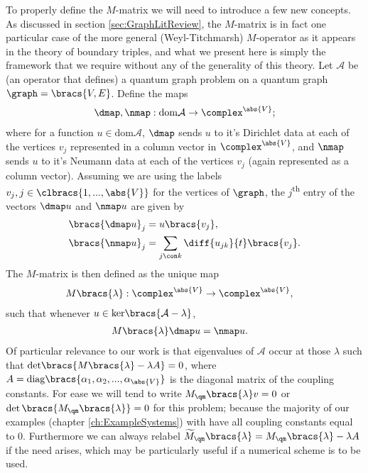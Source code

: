 To properly define the $M$-matrix we will need to introduce a few new concepts.
As discussed in section \ref{sec:GraphLitReview}, the $M$-matrix is in fact one particular case of the more general (Weyl-Titchmarsh) $M$-operator as it appears in the theory of boundary triples, and what we present here is simply the framework that we require without any of the generality of this theory.
Let $\mathcal{A}$ be (an operator that defines) a quantum graph problem on a quantum graph $\graph=\bracs{V,E}$.
Define the maps
\begin{align*}
	\dmap, \nmap: \mathrm{dom}\mathcal{A} \rightarrow \complex^{\abs{V}};
\end{align*}
where for a function $u\in\mathrm{dom}\mathcal{A}$, $\dmap$ sends $u$ to it's Dirichlet data at each of the vertices $v_j$ represented in a column vector in $\complex^{\abs{V}}$, and $\nmap$ sends $u$ to it's Neumann data at each of the vertices $v_j$ (again represented as a column vector).
Assuming we are using the labels $v_j, j\in\clbracs{1,...,\abs{V}}$ for the vertices of $\graph$, the $j$\textsuperscript{th} entry of the vectors $\dmap u$ and $\nmap u$ are given by
\begin{align*}
	\bracs{\dmap u}_j &= u\bracs{v_j}, \\
	\bracs{\nmap u}_j &= \sum_{j\con k}\diff{u_{jk}}{t}\bracs{v_j}.
\end{align*}
The $M$-matrix is then defined as the unique map
\begin{align*}
	M\bracs{\lambda}:\complex^{\abs{V}} &\rightarrow \complex^{\abs{V}},
\end{align*}
such that whenever $u\in\mathrm{ker}\bracs{\mathcal{A}-\lambda}$,
\begin{align*}
	M\bracs{\lambda}\dmap u &= \nmap u.
\end{align*}
Of particular relevance to our work is that eigenvalues of $\mathcal{A}$ occur at those $\lambda$ such that $\mathrm{det}\bracs{M\bracs{\lambda} -\lambda A}= 0$, where $A = \mathrm{diag}\bracs{\alpha_1, \alpha_2, ... , \alpha_{\abs{V}}}$ is the diagonal matrix of the coupling constants.
For ease we will tend to write $M_{\qm}\bracs{\lambda}v=0$ or $\det\bracs{M_{\qm}\bracs{\lambda}}=0$ for this problem; because the majority of our examples (chapter \ref{ch:ExampleSystems}) with have all coupling constants equal to 0.
Furthermore we can always relabel $\widetilde{M}_{\qm}\bracs{\lambda} = M_{\qm}\bracs{\lambda}-\lambda A$ if the need arises, which may be particularly useful if a numerical scheme is to be used. \newline

